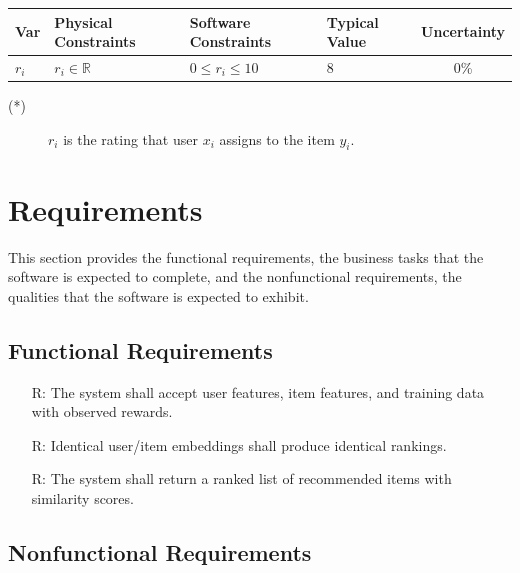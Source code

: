 \documentclass[12pt]{article}
\newcounter{reqnum} %
\begin{document}
\begin{table}[!h]
  \caption{Input Variables} \label{TblInputVar}
  \renewcommand{\arraystretch}{1.2}
\noindent \begin{longtable*}{l l l l c} 
  \toprule
  \textbf{Var} & \textbf{Physical Constraints} & \textbf{Software Constraints} &
                             \textbf{Typical Value} & \textbf{Uncertainty}\\
  \midrule 
  $r_i$ & $r_i \in \mathbb{R}$ & $0 \leq r_i \leq 10$ & 8  & 0\%
  \\
  \bottomrule
\end{longtable*}
\end{table}

\noindent 
\begin{description}
\item[(*)] $r_i$ is the rating that user $x_i$ assigns to the item $y_i$.
\end{description}


\section{Requirements}

This section provides the functional requirements, the business tasks that the
software is expected to complete, and the nonfunctional requirements, the
qualities that the software is expected to exhibit.

\subsection{Functional Requirements}

\noindent \begin{itemize}

\item[R\refstepcounter{reqnum}\thereqnum \label{R_Inputs}:] The system shall accept user features, item features, and training data with observed rewards.

\item[R\refstepcounter{reqnum}\thereqnum \label{R_VerifyOutput}:]
Identical user/item embeddings shall produce identical rankings.

\item[R\refstepcounter{reqnum}\thereqnum \label{R_Output}:]  The system shall return a ranked list of recommended items with similarity scores.

\end{itemize}

\subsection{Nonfunctional Requirements}
\end{document}
